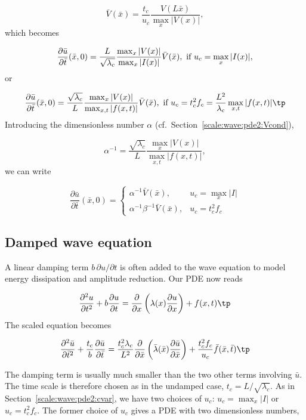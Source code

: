 \documentclass[graybox,envcountchap,sectrefs,final]{svmonodo}
\begin{document}
\[ \bar V(\bar x) = \frac{t_c}{u_c}\frac{V(L\bar x)}{\max_x|V(x)|},\]
which becomes

\[ \frac{\partial\bar u}{\partial\bar t}(\bar x, 0) =
\frac{L}{\sqrt{\lambda_c}}\frac{\max_{x}|V(x)|}{\max_{x}|I(x)|}\bar V(\bar x),
\hbox{ if } u_c=\max_x|I(x)|,\]
or

\[ \frac{\partial\bar u}{\partial\bar t}(\bar x, 0) =
\frac{\sqrt{\lambda_c}}{L}\frac{\max_{x}|V(x)|}{\max_{x,t}|f(x,t)|}
\bar V(\bar x),
\hbox{ if } u_c=t_c^2f_c=\frac{L^2}{\lambda_c}\max_{x,t}|f(x,t)|\tp\]
Introducing the dimensionless number $\alpha$ (cf.~Section~\ref{scale:wave:pde2:Vcond}),

\[ \alpha^{-1} = \frac{\sqrt{\lambda_c}}{L}\frac{\max_{x}|V(x)|}{\max_{x,t}|f(x,t)|},
\]
we can write

\[
\frac{\partial\bar u}{\partial\bar t}(\bar x, 0) =
\left\lbrace \begin{array}{ll}
\alpha^{-1}\bar V(\bar x),& u_c=\max_x|I|\\ 
\alpha^{-1}\beta^{-1}\bar V(\bar x), & u_c=t_c^2f_c
\end{array}\right.
\]

\subsection{Damped wave equation}
\label{scale:wave:pde2:damped}

A linear damping term $b\,\partial u/\partial t$ is often added to
the wave equation to model energy dissipation and amplitude reduction.
Our PDE now reads

\begin{equation}
\frac{\partial^2 u}{\partial t^2}
+ b\frac{\partial u}{\partial t} =
\frac{\partial}{\partial x}\left(
\lambda(x) {\partial u\over\partial x}\right) + f(x,t)\tp
\end{equation}
The scaled equation becomes

\[
\frac{\partial^2 \bar u}{\partial \bar t^2}
+ \frac{t_c} b\frac{\partial \bar u}{\partial \bar t} =
\frac{t_c^2\lambda_c}{L^2}\frac{\partial}{\partial \bar x}\left(
\bar \lambda(\bar x) {\partial \bar u\over\partial \bar x}\right) +
\frac{t_c^2f_c}{u_c}\bar f(\bar x,\bar t)\tp
\]

The damping term is usually much smaller than the two other terms involving
$\bar u$. The time scale is therefore chosen as in the undamped case,
$t_c=L/\sqrt{\lambda_c}$. As in Section~\ref{scale:wave:pde2:cvar},
we have two choices of $u_c$: $u_c=\max_x|I|$ or $u_c=t_c^2f_c$.
The former choice of $u_c$ gives a PDE with two dimensionless numbers,
\end{document}
